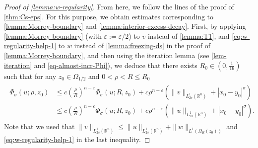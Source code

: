 \documentclass[11pt,reqno]{amsart}
\theoremstyle{plain}
\theoremstyle{definition}
\numberwithin{equation}{section}
\newcommand{\R}{\mathbb{R}}
\newcommand{\1}{\mathbbm{1}}
\begin{document}
\begin{proof}[Proof of \autoref{lemma:w-regularity}]
From here, we follow the lines of the proof of \autoref{thm:Cs-eps}. For this purpose, we obtain estimates corresponding to \autoref{lemma:Morrey-boundary} and \autoref{lemma:interior-excess-decay}. First, by applying \autoref{lemma:Morrey-boundary} (with $\varepsilon:=\varepsilon/2$) to $v$ instead of \autoref{lemma:T1}, and \eqref{eq:w-regularity-help-1} to $w$ instead of \autoref{lemma:freezing-ds} in the proof of \autoref{lemma:Morrey-boundary}, and then using the iteration lemma (see \autoref{lem-iteration} and \eqref{eq-almost-incr-Phi}), we deduce that there exists $R_0 \in (0, \frac{1}{16})$ such that for any $z_0 \in \Omega_{1/2}$ and $0<\rho<R\leq R_0$
\begin{align}
\begin{split}
\label{eq:w-regularity-help-2}
    \Phi_{\sigma}(u; \rho, z_0)
    &\leq c \left( \frac{\rho}{R} \right)^{n-\varepsilon} \Phi_{\sigma}(u; R, z_0) + c \rho^{n-\varepsilon} \left( \|v\|_{L^1_{2s}(\R^n)} + |x_0-y_0|^\sigma \right) \\
    &\leq c \left( \frac{\rho}{R} \right)^{n-\varepsilon} \Phi_{\sigma}(u; R, z_0) + c \rho^{n-\varepsilon} \left( \|u\|_{L^1_{2s}(\R^n)} + |x_0-y_0|^\sigma \right).
\end{split}
\end{align}
Note that we used that $\|v\|_{L^1_{2s}(\R^n)} \leq \|u\|_{L^1_{2s}(\R^n)} + \|w\|_{L^1(\Omega_R(z_0))}$ and \eqref{eq:w-regularity-help-1} in the last inequality.


\end{proof}
\end{document}
